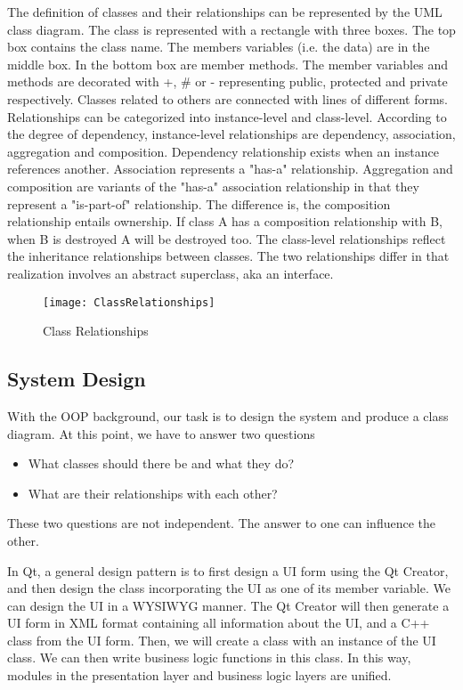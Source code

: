 The definition of classes and their relationships can be represented by the UML class diagram. The class is represented with a rectangle with three boxes. The top box contains the class name. The members variables (i.e. the data) are in the middle box. In the bottom box are member methods. The member variables and methods are decorated with +, \# or - representing public, protected and private respectively. Classes related to others are connected with lines of different forms. Relationships can be categorized into instance-level and class-level. According to the degree of dependency, instance-level relationships are dependency, association, aggregation and composition. Dependency relationship exists when an instance references another. Association represents a "has-a" relationship. Aggregation and composition are variants of the "has-a" association relationship in that they represent a "is-part-of" relationship. The difference is, the composition relationship entails ownership. If class A has a composition relationship with B, when B is destroyed A will be destroyed too. The class-level relationships reflect the inheritance relationships between classes. The two relationships differ in that realization involves an abstract superclass, aka an interface. 

\begin{figure}[htbp]
\centering
\texttt{[image: ClassRelationships]}
\caption{Class Relationships\label{fig:Class Relationships}}
\end{figure}

\subsection{System Design}
With the OOP background, our task is to design the system and produce a class diagram.  At this point, we have to answer two questions
\begin{itemize}
\item What classes should there be and what they do?
\item What are their relationships with each other?
\end{itemize}
These two questions are not independent. The answer to one can influence the other.

In Qt, a general design pattern is to first design a UI form using the Qt Creator, and then design the class incorporating the UI as one of its member variable. We can design the UI in a WYSIWYG manner. The Qt Creator will then generate a UI form in XML format containing all information about the UI, and a C++ class from the UI form. Then, we will create a class with an instance of the UI class. We can then write business logic functions in this class. In this way, modules in the presentation layer and business logic layers are unified. 

